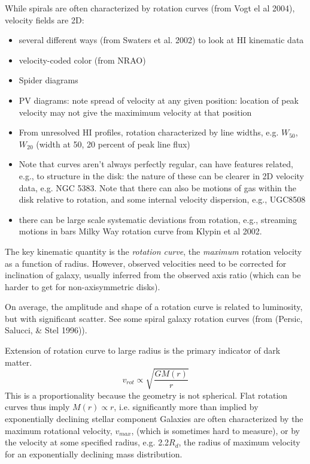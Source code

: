 \documentclass{article}
\begin{document}
While spirals are often
characterized by rotation curves (from Vogt el al 2004), velocity fields
are 2D:
\begin{itemize}
    \item several different ways (from Swaters et al. 2002) to look at HI
        kinematic data
    \item velocity-coded color (from NRAO)
    \item Spider diagrams
    \item PV diagrams: note spread of velocity at any given position: location
        of peak velocity may not give the maximimum velocity at that position
    \item From unresolved HI profiles, rotation characterized by line widths,
        e.g. $W_{50}$, $W_{20}$ (width at 50, 20 percent of peak line flux)
    \item Note that curves aren't always perfectly regular, can have features
        related, e.g., to structure in the disk: the nature of these can be
        clearer in 2D velocity data, e.g. NGC 5383. Note that there can also be
        motions of gas within the disk relative to rotation, and some internal
        velocity dispersion, e.g., UGC8508
    \item there can be large scale systematic deviations from rotation, e.g.,
        streaming motions in bars Milky Way rotation curve from Klypin et al
        2002.
\end{itemize}
The key kinematic quantity is the \textit{rotation curve}, the \emph{maximum}
rotation velocity as a function of radius. However, observed velocities need to
be corrected for inclination of galaxy, usually inferred from the observed axis
ratio (which can be harder to get for non-axisymmetric disks).

On average, the amplitude and shape of a rotation curve is related to luminosity,
but with significant scatter.
See some spiral galaxy rotation curves (from (Persic, Salucci, \& Stel 1996)).

Extension of rotation curve to large radius is the primary indicator of dark
matter.
\[
    v_{rot} \propto \sqrt{ \frac{G M(r)}{r}}
    \]
This is a proportionality because the geometry is not spherical. Flat rotation
curves thus imply  $M(r) \propto r$, i.e. significantly more than implied by
exponentially declining stellar component Galaxies are often characterized by
the maximum rotational velocity, $v_{max}$, (which is sometimes hard to
measure), or by the velocity at some specified radius, e.g. 2.2$R_{d}$, the
radius of maximum velocity for an exponentially declining mass distribution.
\end{document}
